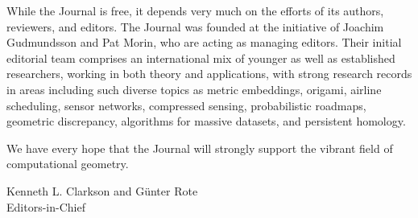 \documentclass{jocg}
\theoremstyle{plain}
\theoremstyle{definition}
\begin{document}
While the Journal is free, it depends very much on the efforts of its authors,
reviewers, and editors. The Journal was founded at the initiative of Joachim
Gudmundsson and Pat Morin, who are acting as managing editors. Their initial
editorial team comprises an international mix of younger as well as
established researchers, working in both theory and applications, with
strong research records in areas including such diverse topics as metric embeddings,
origami, airline scheduling, sensor networks, compressed sensing, probabilistic
roadmaps, geometric discrepancy, algorithms for massive datasets, and persistent homology.

We have every hope that the Journal will strongly support the vibrant field
of computational geometry.

\noindent Kenneth L. Clarkson and G\"{u}nter Rote\\
\noindent Editors-in-Chief
\end{document}
